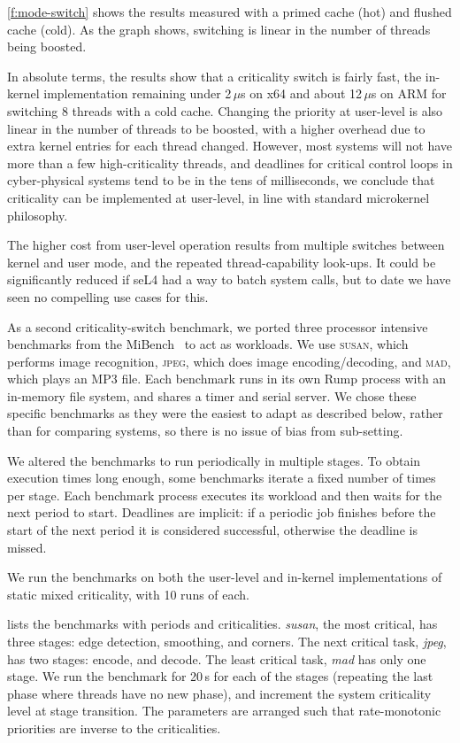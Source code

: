 \autoref{f:mode-switch} shows the results measured with a primed cache (hot) and flushed cache (cold).
As the graph shows, switching is linear in the number of threads being boosted.

In absolute terms, the results show that a criticality switch is fairly fast, the in-kernel implementation
remaining under 2\,$\mu$s on x64 and about 12\,\(\mu\)s on ARM for switching 8 threads
with a cold cache. Changing the priority at user-level is also linear in the number of threads to be boosted, with a higher overhead due to extra
kernel entries for each thread changed.
However, most systems will not have more than a few high-criticality threads, and deadlines for critical control loops in
cyber-physical systems tend to be in the tens of milliseconds, we
conclude that criticality can be implemented at user-level, in line with standard microkernel philosophy.

The higher cost from user-level operation results from  multiple
switches between kernel and user mode, and the repeated
thread-capability look-ups. It could be significantly reduced if seL4
had a way to batch system calls, but to date we have seen no compelling use cases for this.

As a second criticality-switch benchmark, we ported three processor intensive 
benchmarks from the MiBench~\citep{Guthaus_REAMB_01} to act as workloads. 
We use \textsc{susan}, which performs image recognition, \textsc{jpeg}, which does image
encoding/decoding, and \textsc{mad}, which plays an MP3 file.
Each benchmark runs in its own Rump process
with an in-memory file system, and shares a timer and serial server.
 We chose these specific
benchmarks as they were the easiest to adapt as described below,
rather than for comparing systems, so there is no issue of bias from sub-setting.

We altered the benchmarks to run periodically in multiple stages. To obtain
execution times long enough, some benchmarks iterate a fixed number of times per
stage. Each benchmark process executes its workload and then waits for the next period to start.
Deadlines are implicit: if a periodic job finishes before the start of the next period it is
considered successful, otherwise the deadline is missed.

We run the benchmarks on both the user-level and in-kernel implementations of static mixed criticality, with 10 runs of each.

 lists the benchmarks with periods and criticalities.
\textit{susan}, the most critical, has three stages: edge detection, smoothing, and corners. The
next critical task, \textit{jpeg}, has two stages: encode, and decode. The least
critical task, \textit{mad} has only one stage. We run the benchmark
for 20\,s for each of the stages (repeating the last phase where
threads have no new phase), and
increment the system criticality level at stage transition. The parameters are arranged such that
rate-monotonic priorities are inverse to the criticalities.

